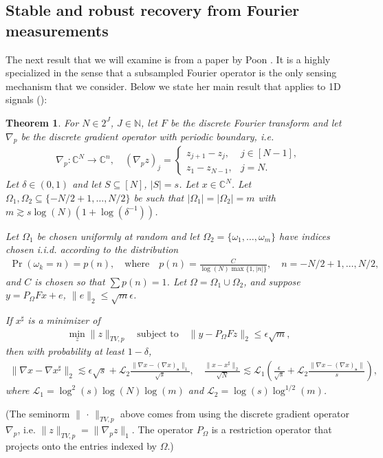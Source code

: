 \documentclass[11pt, oneside]{article}   %
\newtheorem{theorem}{Theorem}
\DeclareMathOperator*{\prob}{Pr}
\newcommand{\bC}{\mathbb{C}}
\newcommand{\bN}{\mathbb{N}}
\renewcommand{\L}{\mathcal{L}}
\newcommand{\norm}[1]{\lVert #1 \rVert}
\newcommand{\abs}[1]{\lvert#1 \rvert}
\begin{document}
\subsection{Stable and robust recovery from Fourier measurements}
The next result that we will examine is from a paper by Poon \cite{poon2015tv}. 
It is a highly specialized in the sense that a subsampled 
Fourier operator is the only sensing mechanism that we consider. 
Below we state her main result that applies to 1D signals (\!\!\cite[Theorem 
2.1]{poon2015tv}):
\begin{theorem}\label{THM2_POON}
        For $N \in 2^J$, $J \in \bN$, let $F$ be the discrete Fourier transform 
and let $\nabla_p$ be the discrete gradient operator with periodic boundary, 
i.e. 
\begin{align*}
        \nabla_p: \bC^N \to \bC^n, 
\quad (\nabla_p z)_j = \begin{cases} 
                               z_{j+1} - z_j, &j \in [N-1], \\
				z_1 - z_{N-1}, &j = N.
                       \end{cases}
\end{align*}
Let $\delta \in (0, 1)$ and let $S \subseteq [N]$, $\abs{S} = s$. Let $x \in 
\bC^N$. Let $\Omega_1, \Omega_2 \subseteq \{-N/2+1, \dots, N/2\}$ be such that 
$\abs{\Omega_1} = \abs{\Omega_2} = m$ with $m \gtrsim s\log(N)(1 + 
\log(\delta^{-1}))$.

Let $\Omega_1$ be chosen uniformly at random and let $\Omega_2 = \{\omega_1, 
\dots, \omega_m\}$ have indices chosen i.i.d. according to the distribution 
\begin{align*}
        \prob(\omega_k = n) = p(n), 
\quad\text{where}\quad
p(n) = \frac{C}{\log(N) \max\{1, \abs{n}\}}, 
\quad 
n = -N/2+1,\dots, N/2,
\end{align*}
and $C$ is chosen so that $\sum p(n) = 1$. Let $\Omega = \Omega_1 \cup 
\Omega_2$, and suppose $y =  P_\Omega Fx + e$, $\norm{e}_2 \leq 
\sqrt{m}\epsilon$. 

If $x^\sharp$ is a minimizer of 
\begin{align*}
        \min_z \norm{z}_{TV, p} \quad\text{subject to}\quad
\norm{y - P_\Omega Fz}_2 \leq \epsilon\sqrt{m}, 
\end{align*}
then with probability at least $1 - \delta$,
\begin{align}
        \norm{\nabla x - \nabla x^\sharp}_2
\lesssim \epsilon\sqrt{s} + \L_2\frac{\norm{\nabla x - (\nabla 
x)_\mathbf{s}}_1}{\sqrt{s}},
\quad 
\frac{\norm{x - x^\sharp}_2}{\sqrt{N}} 
\lesssim \L_1\left(\frac{\epsilon}{\sqrt{s}}
 + \L_2 \frac{\norm{\nabla x - (\nabla x)_\mathbf{s}}}{s}
\right),
\label{poon_err_bound}
\end{align}
where $\L_1 = \log^2(s)\log(N)\log(m)$ and $\L_2 = \log(s)\log^{1/2}(m)$.
\end{theorem}
(The seminorm $\norm{\,\cdot\,}_{TV, p}$ above comes from using the discrete gradient operator $\nabla_p$, i.e. $\norm{z}_{TV,p} = \norm{\nabla_p z}_1$. The operator $P_\Omega$ is a restriction operator that projects onto the entries indexed by $\Omega$.)
\end{document}
